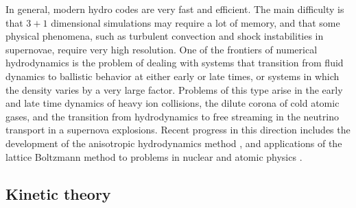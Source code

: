  In general, modern hydro codes are very fast and efficient. The main 
difficulty is that $3+1$ dimensional simulations may require a lot 
of memory, and that some physical phenomena, such as turbulent 
convection and shock instabilities in supernovae, require very high 
resolution. One of the frontiers of numerical hydrodynamics is the 
problem of dealing with systems that transition from fluid dynamics
to ballistic behavior at either early or late times, or systems in
which the density varies by a very large factor. Problems of this 
type arise in the early and late time dynamics of heavy ion collisions, 
the dilute corona of cold atomic gases, and the transition from 
hydrodynamics to free streaming in the neutrino transport in a 
supernova explosions. Recent progress in this direction includes
the development of the anisotropic hydrodynamics method 
\cite{Florkowski:2010cf,Martinez:2010sc,Bluhm:2015raa,Bluhm:2015bzi}, 
and applications of the lattice Boltzmann method to problems in nuclear 
and atomic physics \cite{Romatschke:2011hm,Brewer:2015hua}.

\subsection{Kinetic theory}

